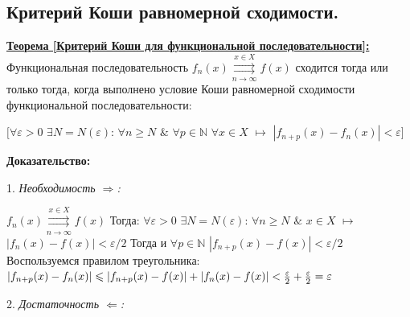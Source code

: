 \documentclass[a4paper,12pt]{article} %
\renewcommand {\geq}{\geqslant}
\renewcommand {\leq}{\leqslant}
\begin{document}
\subsection{Критерий Коши равномерной сходимости.}

\underline{\textbf{Теорема [Критерий Коши для функциональной последовательности]:}} Функциональная последовательность $f_n(x) \overset{x \in X}{\underset{n \rightarrow \infty}{\rightrightarrows}} f(x)$ сходится тогда или только тогда, когда выполнено условие Коши
равномерной сходимости функциональной последовательности: \newline

\hspace*{5mm}$\big[\forall \varepsilon > 0 $  $\exists N = N(\varepsilon)$: $\forall n \geq N$  $\&$ $\forall p \in  \mathds{N}$ $\forall x \in X$ $\longmapsto$ \newline 
\hspace*{50mm}$|f_{n+p}(x) -f_n(x)| < \varepsilon\big]$

\noindent \textbf{Доказательство:} \newline

 1. \textit{Необходимость $\Rightarrow$:} \newline

\noindent $f_n(x) \overset{x \in X}{\underset{n \rightarrow \infty}{\rightrightarrows}} f(x)$ 
\newline \newline
Тогда: \newline
\hspace*{5mm}$\forall \varepsilon > 0$ $\exists N = N(\varepsilon)$:
$\forall n \geq N$ $\&$ $x \in X$ $\longmapsto$ $|f_n(x) - f(x)| < \varepsilon / 2$ \newline
Тогда и 
\newline 
\hspace*{5mm}$\forall p \in \mathds{N}$ $|f_{n+p}(x) - f(x)| < \varepsilon / 2$
\newline \newline 
Воспользуемся правилом треугольника: \newline \newline
$|f_{n+p}(x) - f_n(x)| \leq |f_{n+p}(x) - f(x)| + |f_n(x) - f(x)| < {\varepsilon \over 2} + {\varepsilon \over 2} = \varepsilon$
\noindent  \newline \newline

2. \textit{Достаточность $\Leftarrow$:} \newline
\end{document}
